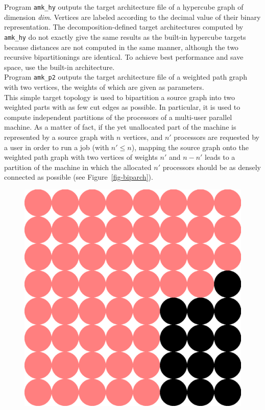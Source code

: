 \begin{itemize}
\noi
Program \texttt{amk\_hy} outputs the target architecture file of a hypercube graph
of dimension {\it dim}. Vertices are labeled according to the decimal value
of their binary representation.
The decomposition-defined target architectures computed by \texttt{amk\_hy}
do not exactly give the same results as the built-in hypercube targets
because distances are not computed in the same manner, although
the two recursive bipartitionings are identical.
To achieve best performance and save space, use the built-in architecture.
\\

\noi
Program \texttt{amk\_p2} outputs the target architecture file of a weighted path
graph with two vertices, the weights of which are given as parameters.
\\
This simple target topology is used to bipartition a source graph into
two weighted parts with as few cut edges as possible.
In particular, it is used to compute independent partitions of the
processors of a multi-user parallel machine. As a matter of fact,
if the yet unallocated part of the machine is represented by a source
graph with $n$ vertices, and $n'$ processors are requested by a user
in order to run a job (with $n' \leq n$),
mapping the source graph onto the weighted path graph with two
vertices of weights $n'$ and $n-n'$ leads to a partition of the machine in
which the allocated $n'$ processors should be as densely connected as
possible (see Figure~\ref{fig-biparch}).
\begin{figure}[hbt]
\hfill
\parbox[t]{5.8cm}{
\hfill
\includegraphics[scale=0.25]{s_f_do1.ps}
}
\end{figure}
\end{itemize}
